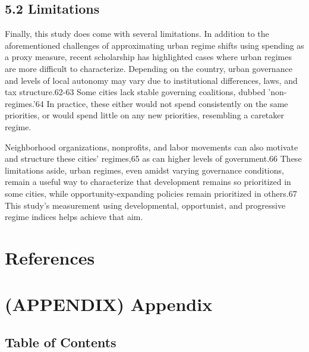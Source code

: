 \documentclass[preprint, 3p,
authoryear]{elsarticle} %
\newlength{\cslhangindent}
\newlength{\cslentryspacingunit} %
\newenvironment{CSLReferences}[2] %
 {%
  \setlength{\parindent}{0pt}
  \ifodd #1
  \let\oldpar\par
  \def\par{\hangindent=\cslhangindent\oldpar}
  \fi
  \setlength{\parskip}{#2\cslentryspacingunit}
 }%
 {}
\begin{document}
\renewcommand{\arraystretch}{1}

\doublespacing

\hypertarget{limitations}{%
\subsection{5.2 Limitations}\label{limitations}}

Finally, this study does come with several limitations. In addition to
the aforementioned challenges of approximating urban regime shifts using
spending as a proxy measure, recent scholarship has highlighted cases
where urban regimes are more difficult to characterize. Depending on the
country, urban governance and levels of local autonomy may vary due to
institutional differences, laws, and tax structure.62-63 Some cities
lack stable governing coalitions, dubbed 'non-regimes.'64 In practice,
these either would not spend consistently on the same priorities, or
would spend little on any new priorities, resembling a caretaker regime.

Neighborhood organizations, nonprofits, and labor movements can also
motivate and structure these cities' regimes,65 as can higher levels of
government.66 These limitations aside, urban regimes, even amidst
varying governance conditions, remain a useful way to characterize that
development remains so prioritized in some cities, while
opportunity-expanding policies remain prioritized in others.67 This
study's measurement using developmental, opportunist, and progressive
regime indices helps achieve that aim.

\singlespacing

\hypertarget{references}{%
\section*{References}\label{references}}

\hypertarget{refs}{}
\begin{CSLReferences}{0}{0}
\end{CSLReferences}

\hypertarget{appendix-appendix}{%
\section*{(APPENDIX) Appendix}\label{appendix-appendix}}

\hypertarget{table-of-contents}{%
\subsection{Table of Contents}\label{table-of-contents}}
\end{document}

